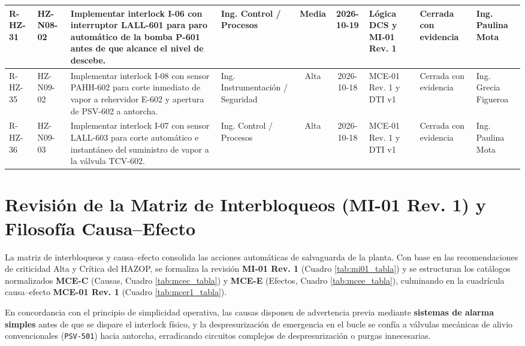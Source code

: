 \documentclass[10pt,letterpaper]{article}
\begin{document}
\begin{landscape}
\begin{xltabular}{\linewidth}{|l|l|>{\raggedright\arraybackslash}X|p{2.4cm}|c|c|p{2.4cm}|p{1.8cm}|p{2.0cm}|}
R-HZ-31 & HZ-N08-02 & Implementar interlock I-06 con interruptor LALL-601 para paro automático de la bomba P-601 antes de que alcance el nivel de descebe. & Ing. Control / Procesos & Media & 2026-10-19 & Lógica DCS y MI-01 Rev. 1 & Cerrada con evidencia & Ing. Paulina Mota \\ \hline
R-HZ-35 & HZ-N09-02 & Implementar interlock I-08 con sensor PAHH-602 para corte inmediato de vapor a rehervidor E-602 y apertura de PSV-602 a antorcha. & Ing. Instrumentación / Seguridad & Alta & 2026-10-18 & MCE-01 Rev. 1 y DTI v1 & Cerrada con evidencia & Ing. Grecia Figueroa \\ \hline
R-HZ-36 & HZ-N09-03 & Implementar interlock I-07 con sensor LALL-603 para corte automático e instantáneo del suministro de vapor a la válvula TCV-602. & Ing. Control / Procesos & Alta & 2026-10-18 & MCE-01 Rev. 1 y DTI v1 & Cerrada con evidencia & Ing. Paulina Mota \\ \hline
\end{xltabular}
\end{landscape}
\newpage

\section{Revisión de la Matriz de Interbloqueos (MI-01 Rev. 1) y Filosofía Causa--Efecto}
La matriz de interbloqueos y causa--efecto consolida las acciones automáticas de salvaguarda de la planta. Con base en las recomendaciones de criticidad Alta y Crítica del HAZOP, se formaliza la revisión \textbf{MI-01 Rev. 1} (Cuadro \ref{tab:mi01_tabla}) y se estructuran los catálogos normalizados \textbf{MCE-C} (Causas, Cuadro \ref{tab:mcec_tabla}) y \textbf{MCE-E} (Efectos, Cuadro \ref{tab:mcee_tabla}), culminando en la cuadrícula causa--efecto \textbf{MCE-01 Rev. 1} (Cuadro \ref{tab:mcer1_tabla}).

En concordancia con el principio de simplicidad operativa, las causas disponen de advertencia previa mediante \textbf{sistemas de alarma simples} antes de que se dispare el interlock físico, y la despresurización de emergencia en el bucle se confía a válvulas mecánicas de alivio convencionales (\texttt{PSV-501}) hacia antorcha, erradicando circuitos complejos de despresurización o purgas innecesarias.
\end{document}

